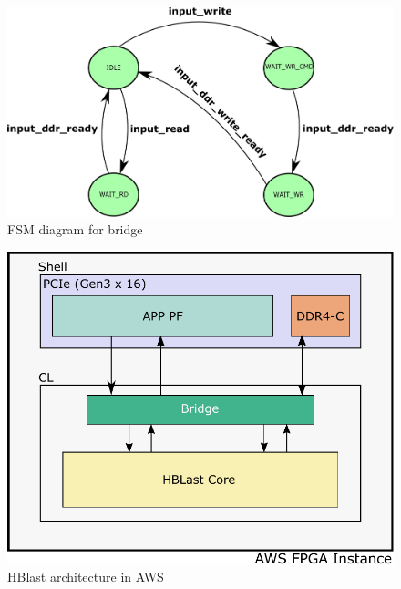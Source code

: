 \begin{figure}
\centering
\includegraphics[width=\columnwidth]{Figures/bridgeFSM.pdf}
\caption{FSM diagram for bridge} \label{fig:bridge}
\end{figure}


\begin{figure}[t!]
\centering
\includegraphics[width=0.9\columnwidth]{Figures/AwsArch.pdf}
\caption{HBlast architecture in AWS} \label{fig:awsArch}
\end{figure}